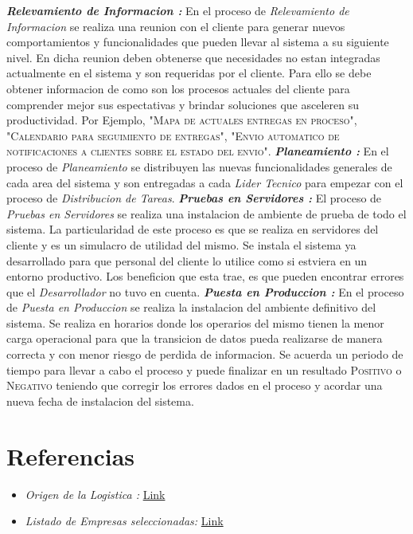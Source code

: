 \documentclass[
10pt, %
a4paper, %
oneside, %
headinclude,footinclude, %
BCOR5mm, %
]{scrartcl}
\begin{document}
\begin{flushleft}
  \textbf{ \emph{Relevamiento de Informacion : } } En el proceso de
  \textit{Relevamiento de Informacion} se realiza una reunion con el cliente
  para generar nuevos comportamientos y funcionalidades que pueden llevar al
  sistema a su siguiente nivel. En dicha reunion deben obtenerse que necesidades
  no estan integradas actualmente en el sistema y son requeridas por el cliente.
  Para ello se debe obtener informacion de como son los procesos actuales del
  cliente para comprender mejor sus espectativas y brindar soluciones que
  asceleren su productividad.
  Por Ejemplo,
  "\textsc{Mapa de actuales entregas en proceso}",
  "\textsc{Calendario para seguimiento de entregas}",
  "\textsc{Envio automatico de notificaciones a clientes sobre el estado del envio}".
  \newline  \newline
  \textbf{ \emph{Planeamiento : } } En el proceso de \textit{Planeamiento} se
  distribuyen las nuevas funcionalidades generales de cada area del sistema y
  son entregadas a cada \textit{Lider Tecnico} para empezar con el proceso de
  \textit{Distribucion de Tareas}.
  \newline  \newline
  \textbf{ \emph{Pruebas en Servidores : } } El proceso de
  \textit{Pruebas en Servidores} se realiza una instalacion de ambiente
  de prueba de todo el sistema. La particularidad de este proceso es que
  se realiza en servidores del cliente y es un simulacro de utilidad del mismo.
  Se instala el sistema ya desarrollado para que personal del cliente lo
  utilice como si estviera en un entorno productivo. Los beneficion que esta
  trae, es que pueden encontrar errores que el \textit{Desarrollador} no tuvo
  en cuenta.
  \newline  \newline
  \textbf{ \emph{Puesta en Produccion : } } En el proceso de
  \textit{Puesta en Produccion} se realiza la instalacion del ambiente
  definitivo del sistema. Se realiza en horarios donde los operarios del mismo
  tienen la menor carga operacional para que la transicion de datos pueda
  realizarse de manera correcta y con menor riesgo de perdida de informacion.
  Se acuerda un periodo de tiempo para llevar a cabo el proceso y puede
  finalizar en un resultado \textsc{Positivo} o \textsc{Negativo} teniendo
  que corregir los errores dados en el proceso y acordar una nueva fecha de
  instalacion del sistema.
  \end{flushleft}



\section{Referencias}

\begin{itemize}
  \item \textit{Origen de la Logistica :} \href{https://clusterlogistic.org/es/historia-de-la-logistica/} {Link}
  \item \textit{Listado de Empresas seleccionadas:} \href{https://servicios.transporte.gob.ar/gobierno_abierto/detalle.php?t=empresas&d=nacional} {Link}
\end{itemize}
\end{document}
